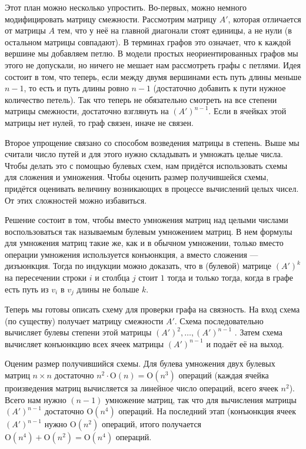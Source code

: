 \documentclass[a4paper]{article}
\theoremstyle{named}
\renewcommand{\O}{\text{O}}
\begin{document}
\begin{colloq}
\begin{solution}
            Этот план можно несколько упростить. Во-первых, можно немного модифицировать матрицу смежности. Рассмотрим матрицу $A'$, которая отличается от матрицы $A$ тем, что у неё на главной диагонали стоят единицы, а не нули (в остальном матрицы совпадают). В терминах графов это означает, что к каждой вершине мы добавляем петлю. В модели простых неориентированных графов мы этого не допускали, но ничего не мешает нам рассмотреть графы с петлями. Идея состоит в том, что теперь, если между двумя вершинами есть путь длины меньше $n - 1$, то есть и путь длины ровно $n - 1$ (достаточно добавить к пути нужное количество петель). Так что теперь не обязательно смотреть на все степени матрицы смежности, достаточно взглянуть на $(A')^{n - 1}$. Если в ячейках этой матрицы нет нулей, то граф связен, иначе не связен.
            
            Второе упрощение связано со способом возведения матрицы в степень. Выше мы считали число путей и для этого нужно складывать и умножать целые числа. Чтобы делать это с помощью булевых схем, нам придётся использовать схемы для сложения и умножения. Чтобы оценить размер получившейся схемы, придётся оценивать величину возникающих в процессе вычислений целых чисел. От этих сложностей можно избавиться.

            Решение состоит в том, чтобы вместо умножения матриц над целыми числами воспользоваться так называемым булевым умножением матриц. В нем формулы для умножения матриц такие же, как и в обычном умножении, только вместо операции умножения используется конъюнкция, а вместо сложения --- дизъюнкция. Тогда по индукции можно доказать, что в (булевой) матрице $(A')^k$ на пересечении строки $i$ и столбца $j$ стоит $1$ тогда и только тогда, когда в графе есть путь из $v_i$ в $v_j$ длины не больше $k$.

            Теперь мы готовы описать схему для проверки графа на связность. На вход схема (по существу) получает матрицу смежности $A'$. Схема последовательно вычисляет булевы степени этой матрицы $(A')^2, \dots, (A')^{n - 1}$ . Затем схема вычисляет конъюнкцию всех ячеек матрицы $(A')^{n - 1}$ и подаёт её на выход.

            Оценим размер получившийся схемы. Для булева умножения двух булевых матриц $n \times n$ достаточно $n^2 \cdot \O(n) = \O(n^3)$ операций (каждая ячейка произведения матриц вычисляется за линейное число операций, всего ячеек $n^2$). Всего нам нужно $(n - 1)$ умножение матриц, так что для вычисления матрицы $(A')^{n - 1}$ достаточно $\O(n^4)$ операций. На последний этап (конъюнкция ячеек $(A')^{n - 1}$ нужно $\O(n^2)$ операций, итого получается $\O(n^4) + \O(n^2) = \O(n^4)$ операций.
        \end{solution}


\end{colloq}
\end{document}
